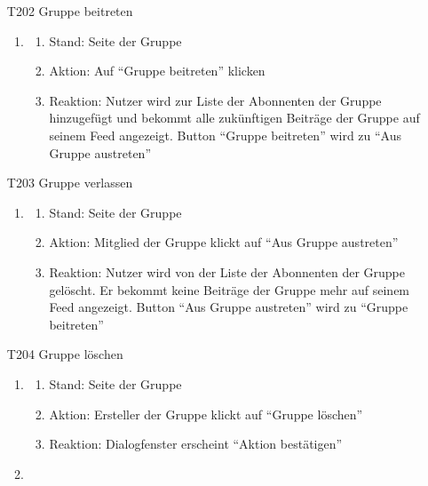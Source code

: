 \documentclass[parskip=full]{scrartcl}
\begin{document}
\begin{itemize}
		\item[T202] Gruppe beitreten
		\begin{enumerate}
			\item
			
			\begin{enumerate}[nosep]
				\item Stand: Seite der Gruppe
				\item Aktion:  Auf “Gruppe beitreten” klicken
				\item Reaktion:  Nutzer wird zur Liste der Abonnenten der Gruppe hinzugefügt und bekommt alle zukünftigen Beiträge der Gruppe auf seinem Feed angezeigt. Button “Gruppe beitreten” wird zu “Aus Gruppe austreten”
			\end{enumerate}
			
		\end{enumerate}
		
		\item[T203] Gruppe verlassen
		\begin{enumerate}
			\item
			
			\begin{enumerate}[nosep]
				\item Stand: Seite der Gruppe
				\item Aktion:  Mitglied der Gruppe klickt auf “Aus Gruppe austreten”
				\item Reaktion:   Nutzer wird von der Liste der Abonnenten der Gruppe gelöscht. Er bekommt keine Beiträge der Gruppe mehr auf seinem Feed angezeigt. Button “Aus Gruppe austreten” wird zu “Gruppe beitreten”
			\end{enumerate}
			
		\end{enumerate}		
		
			\item[T204] Gruppe löschen
			\begin{enumerate}
				\item
				
				\begin{enumerate}[nosep]
					\item Stand: Seite der Gruppe
					\item Aktion: Ersteller der Gruppe klickt auf “Gruppe löschen”
					\item Reaktion: Dialogfenster erscheint “Aktion bestätigen”
				\end{enumerate}
				
				\item
				

\end{enumerate}
\end{itemize}
\end{document}
